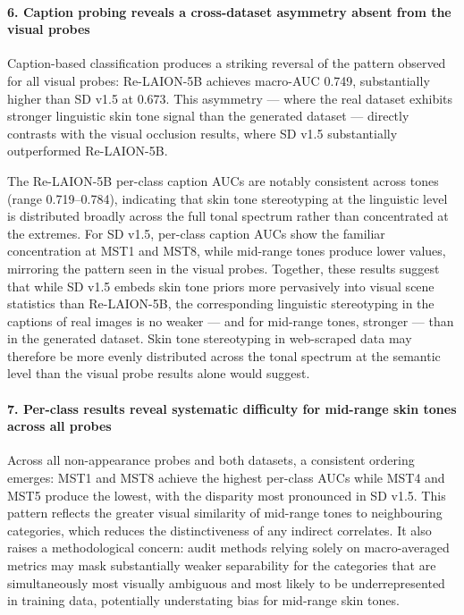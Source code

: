 \paragraph{6. Caption probing reveals a cross-dataset asymmetry absent from the visual
	probes}

Caption-based classification produces a striking reversal of the pattern observed for
all visual probes: Re-LAION-5B achieves macro-AUC 0.749, substantially higher than SD
v1.5 at 0.673. This asymmetry --- where the real dataset exhibits stronger linguistic
skin tone signal than the generated dataset --- directly contrasts with the visual
occlusion results, where SD v1.5 substantially outperformed Re-LAION-5B.

The Re-LAION-5B per-class caption AUCs are notably consistent across tones
(range 0.719--0.784), indicating that skin tone stereotyping at the linguistic level is
distributed broadly across the full tonal spectrum rather than concentrated at the
extremes. For SD v1.5, per-class caption AUCs show the familiar concentration at MST1
and MST8, while mid-range tones produce lower values, mirroring the pattern seen in the
visual probes. Together, these results suggest that while SD v1.5 embeds skin tone priors
more pervasively into visual scene statistics than Re-LAION-5B, the corresponding
linguistic stereotyping in the captions of real images is no weaker --- and for mid-range
tones, stronger --- than in the generated dataset. Skin tone stereotyping in web-scraped
data may therefore be more evenly distributed across the tonal spectrum at the semantic
level than the visual probe results alone would suggest.

\paragraph{7. Per-class results reveal systematic difficulty for mid-range skin tones
	across all probes}

Across all non-appearance probes and both datasets, a consistent ordering emerges: MST1
and MST8 achieve the highest per-class AUCs while MST4 and MST5 produce the lowest,
with the disparity most pronounced in SD v1.5. This pattern reflects the greater visual
similarity of mid-range tones to neighbouring categories, which reduces the distinctiveness
of any indirect correlates. It also raises a methodological concern: audit methods relying
solely on macro-averaged metrics may mask substantially weaker separability for the
categories that are simultaneously most visually ambiguous and most likely to be
underrepresented in training data, potentially understating bias for mid-range skin tones.

